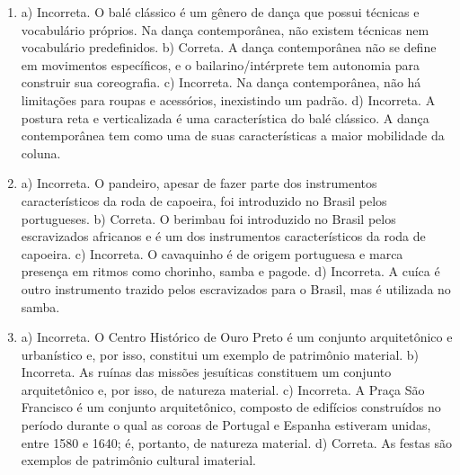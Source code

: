 \begin{enumerate}
\item
a) Incorreta. O balé clássico é um gênero de dança que possui técnicas e
  vocabulário próprios. Na dança contemporânea, não existem técnicas nem
  vocabulário predefinidos.
b) Correta. A dança contemporânea não se define em movimentos específicos,
  e o bailarino/intérprete tem autonomia para construir sua coreografia.
c) Incorreta. Na dança contemporânea, não há limitações para roupas e
  acessórios, inexistindo um padrão.
d) Incorreta. A postura reta e verticalizada é uma característica do balé
  clássico. A dança contemporânea tem como uma de suas características a
  maior mobilidade da coluna.

\item
a) Incorreta. O pandeiro, apesar de fazer parte dos instrumentos
característicos da roda de capoeira, foi introduzido no Brasil pelos
portugueses.
b) Correta. O berimbau foi introduzido no Brasil pelos escravizados
africanos e é um dos instrumentos característicos da roda de capoeira.
c) Incorreta. O cavaquinho é de origem portuguesa e marca presença em
ritmos como chorinho, samba e pagode.
d) Incorreta. A cuíca é outro instrumento trazido pelos escravizados para o
Brasil, mas é utilizada no samba.

\item
a) Incorreta. O Centro Histórico de Ouro Preto é um conjunto arquitetônico e
urbanístico e, por isso, constitui um exemplo de patrimônio material.
b) Incorreta. As ruínas das missões jesuíticas constituem um
conjunto arquitetônico e, por isso, de natureza material.
c) Incorreta. A Praça São Francisco é um conjunto arquitetônico,
composto de edifícios construídos no período durante o qual as coroas de
Portugal e Espanha estiveram unidas, entre 1580 e 1640; é, portanto, de
natureza material.
d) Correta. As festas são exemplos de patrimônio cultural imaterial.
\end{enumerate}
